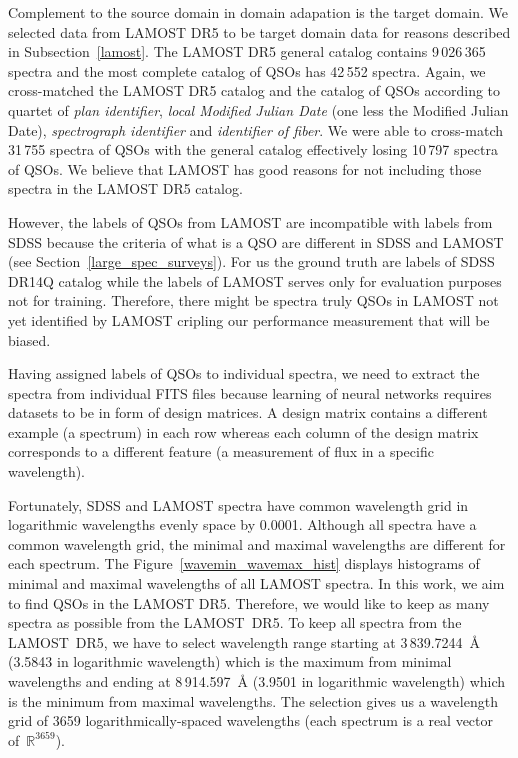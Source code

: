 Complement to the source domain in domain adapation is the target domain.
We selected data from LAMOST DR5 to be target domain data
for reasons described in Subsection~\ref{lamost}.
The LAMOST DR5 general catalog contains 9\,026\,365 spectra
and the most complete catalog of QSOs has 42\,552 spectra.
Again, we cross-matched the LAMOST DR5 catalog and the catalog of QSOs
according to quartet of \textit{plan identifier}, \textit{local Modified Julian Date} (one less the Modified Julian Date), \textit{spectrograph identifier} and \textit{identifier of fiber}.
We were able to cross-match 31\,755 spectra of QSOs with the general catalog
effectively losing 10\,797 spectra of QSOs.
We believe that LAMOST has good reasons for not including those spectra in the LAMOST DR5 catalog.

However, the labels of QSOs from LAMOST are incompatible with labels from SDSS
because the criteria of what is a QSO are different in SDSS and LAMOST
(see Section~\ref{large_spec_surveys}).
For us the ground truth are labels of SDSS DR14Q catalog
while the labels of LAMOST serves only for evaluation purposes
not for training.
Therefore, there might be spectra truly QSOs in LAMOST
not yet identified by LAMOST cripling our performance measurement
that will be biased.

Having assigned labels of QSOs to individual spectra,
we need to extract the spectra from individual FITS files
because learning of neural networks requires datasets to be in form of design matrices.
A design matrix contains a different example (a spectrum) in each row
whereas each column of the design matrix corresponds to a different feature
(a measurement of flux in a specific wavelength).~\cite{goodfellow2016}

Fortunately, SDSS and LAMOST spectra have common wavelength grid in logarithmic wavelengths evenly space by 0.0001.
Although all spectra have a common wavelength grid,
the minimal and maximal wavelengths are different for each spectrum.
The Figure~\ref{wavemin_wavemax_hist} displays histograms of minimal and maximal wavelengths of all LAMOST spectra.
In this work, we aim to find QSOs in the LAMOST DR5.
Therefore, we would like to keep as many spectra as possible from the LAMOST~DR5.
To keep all spectra from the LAMOST~DR5,
we have to select wavelength range starting at 3\,839.7244~\AA{} (3.5843 in logarithmic wavelength)
which is the maximum from minimal wavelengths
and ending at 8\,914.597~\AA{} (3.9501 in logarithmic wavelength)
which is the minimum from maximal wavelengths.
The selection gives us a wavelength grid of 3659 logarithmically-spaced wavelengths
(each spectrum is a real vector of~\(\mathbb{R}^{3659}\)).

